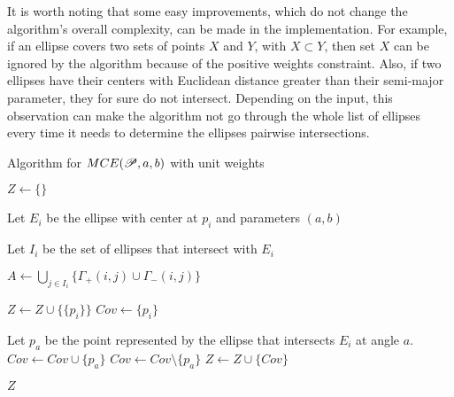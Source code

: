 It is worth noting that some easy improvements, which do not change the algorithm's overall complexity, can be made in the implementation. For example, if an ellipse covers two sets of points $X$ and $Y$, with $X \subset Y$, then set $X$ can be ignored by the algorithm because of the positive weights constraint. Also, if two ellipses have their centers with Euclidean distance greater than their semi-major parameter, they for sure do not intersect. Depending on the input, this observation can make the algorithm not go through the whole list of ellipses every time it needs to determine the ellipses pairwise intersections.



\begin{algoritmo}
\caption{Algorithm for $MCE(\mathscr{P}, a, b)$ with unit weights}\label{algoritmo:mce1}

\begin{algorithmic}[1]

\item[]
\State $Z \gets \{\}$ 

\State Let $E_i$ be the ellipse with center at $p_i$ and parameters $(a,b)$

\State Let $I_i$ be the set of ellipses that intersect with $E_i$


\State $A \gets \bigcup_{j \in I_i} \{\Gamma_+(i,j) \cup \Gamma_-(i,j)\}$ 


\State $Z \gets Z \cup \{\{p_i\}\}$
\State $Cov \gets \{p_i\}$ 

 
\State Let $p_a$ be the point represented by the ellipse that intersects $E_i$ at angle $a$. 
\State $Cov \gets Cov \cup \{p_a\}$
\Else
\State $Cov \gets Cov \setminus \{p_a\}$
\EndIf
\State $Z \gets Z \cup \{Cov\}$
\EndFor
\EndFor
\EndFor

\State \Return $Z$
\EndProcedure


\end{algorithmic}
\end{algoritmo}


